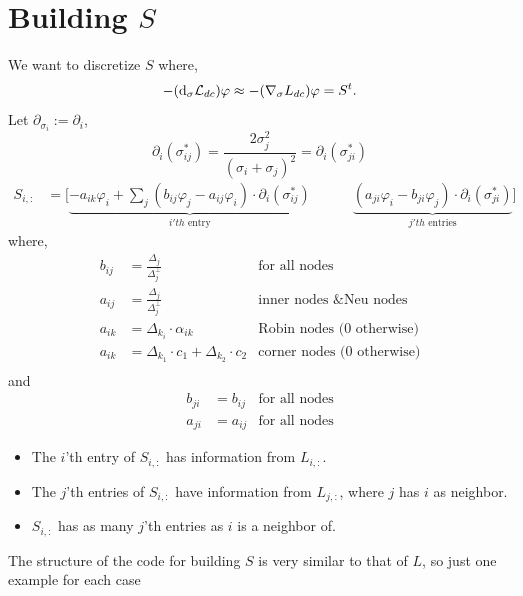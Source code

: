 \documentclass[a4paper,12pt]{article}
\begin{document}
\section{Building $S$}
We want to discretize $S$ where,
\begin{align*}
-({\rm d}_{\sigma} \mathcal{L}_{dc}) \varphi \approx
-(\nabla_{\sigma}L_{dc})\varphi = S^t.
\end{align*}
Let $\partial_{\sigma_i}:=\partial_i$,
\[
\partial_i(\sigma_{ij}^{*}) = \frac{2 \sigma_{j}^{2}}{(\sigma_{i}+\sigma_{j})^2}=
\partial_i(\sigma_{ji}^{*})
\]
\begin{align*}
S_{i,:} &=  
\Big[
\underbrace{ 
-a_{ik}\varphi_i + 
\sum_j ( b_{ij}\varphi_j - a_{ij}\varphi_i ) \cdot \partial_i(\sigma_{ij}^{*}) 
}_{i'th \text{ entry}}
\hspace{3em}
\underbrace{ 
( a_{ji}\varphi_i - b_{ji}\varphi_j ) \cdot \partial_i(\sigma_{ji}^{*}) 
}_{j'th \text{ entries}}
\Big]
\end{align*}
where,
\begin{align*}
b_{ij} &=
\frac{\Delta_j}{\Delta_{j}^{\bot}} & \text{for all nodes} \\
a_{ij} &=
\frac{\Delta_j}{\Delta_{j}^{\bot}} & \text{inner nodes \& Neu nodes} \\
a_{ik} &= 
\Delta_{k_i} \cdot \alpha_{ik}
 & \text{Robin nodes ($0$ otherwise)} \\
 a_{ik} &=
 \Delta_{k_1} \cdot c_{1} + \Delta_{k_2} \cdot c_{2}
 & \text{corner nodes ($0$ otherwise)} \\
\end{align*}
and
\begin{align*}
b_{ji} &= b_{ij} & \text{for all nodes} \\
a_{ji} &= a_{ij} & \text{for all nodes}
\end{align*}
%
\begin{itemize}
\item The $i$'th entry of $S_{i,:}$ has information from $L_{i,:}$.
\item The $j$'th entries of $S_{i,:}$ have information from $L_{j,:}$, where $j$ has $i$ as neighbor.
\item $S_{i,:}$ has as many $j$'th entries as $i$ is a neighbor of.
\end{itemize}
%
The structure of the code for building $S$ is very similar to that of $L$, so just one example for each case 
\end{document}
